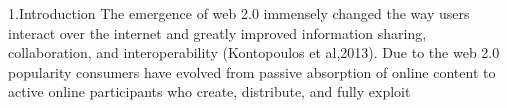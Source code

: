 \documentclass[headsepline,footsepline,footinclude=false,oneside,fontsize=12pt,paper=a4,listof=totoc,bibliography=totoc]{scrbook} %
\begin{document}


\frontmatter{}




\linespread{1.25} %

\setcounter{secnumdepth}{5}
\setcounter{tocdepth}{5}
\tableofcontents{}



\listoffigures{}
\listoftables{}



\mainmatter{}


1.Introduction
The emergence of web 2.0 immensely changed the way users interact over the internet and greatly improved information sharing, collaboration, and interoperability (Kontopoulos et al,2013). Due to the web 2.0 popularity consumers have evolved from passive absorption of online content to active online participants who create, distribute, and fully exploit 


\begin{appendices}
\end{appendices}



 

\end{document}
